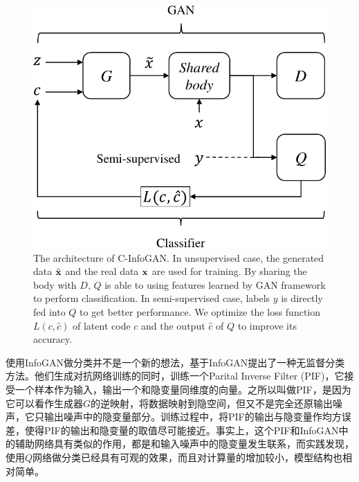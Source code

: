 \begin{figure}[htbp]
  \centering
  \includegraphics[width=\onef\textwidth]{Img/arch-cinfogan.pdf} 
  {The architecture of C-InfoGAN. In unsupervised case, the generated data $\tilde{\mathbf{x}}$ and the real data $\mathbf{x}$ are used for training. By sharing the body with $D$, $Q$ is able to using features learned by GAN framework to perform classification. In semi-supervised case, labels $y$ is directly fed into $Q$ to get better performance. We optimize the loss function $L(c, \hat{c})$ of latent code $c$ and the output $\hat{c}$ of $Q$ to improve its accuracy.}
  \label{fig:c-infogan}
\end{figure}

使用InfoGAN做分类并不是一个新的想法，\citet{zhang2018cramer}基于InfoGAN提出了一种无监督分类方法。他们生成对抗网络训练的同时，训练一个Parital Inverse Filter (PIF)，它接受一个样本作为输入，输出一个和隐变量同维度的向量。之所以叫做PIF，是因为它可以看作生成器$G$的逆映射，将数据映射到隐空间，但又不是完全还原输出噪声，它只输出噪声中的隐变量部分。训练过程中，将PIF的输出与隐变量作均方误差，使得PIF的输出和隐变量的取值尽可能接近。事实上，这个PIF和InfoGAN中的辅助网络具有类似的作用，都是和输入噪声中的隐变量发生联系，而实践发现，使用$Q$网络做分类已经具有可观的效果，而且对计算量的增加较小，模型结构也相对简单。

